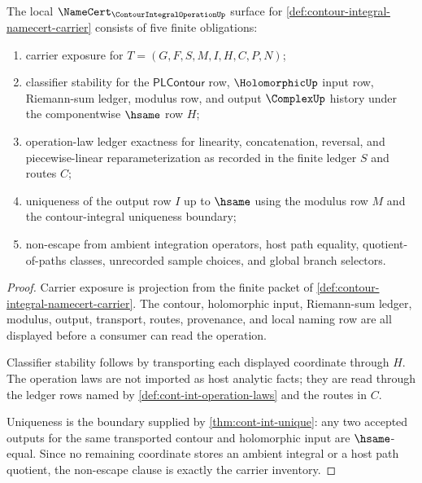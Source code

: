 \begin{theorem}
\label{thm:contour-integral-namecert-obligations}
The local $\NameCert_{\ContourIntegralOperationUp}$ surface for \autoref{def:contour-integral-namecert-carrier} consists of five finite obligations:
\begin{enumerate}
\item carrier exposure for $T=(G,F,S,M,I,H,C,P,N)$;
\item classifier stability for the $\mathsf{PLContour}$ row, $\HolomorphicUp$ input row, Riemann-sum ledger, modulus row, and output $\ComplexUp$ history under the componentwise $\hsame$ row $H$;
\item operation-law ledger exactness for linearity, concatenation, reversal, and piecewise-linear reparameterization as recorded in the finite ledger $S$ and routes $C$;
\item uniqueness of the output row $I$ up to $\hsame$ using the modulus row $M$ and the contour-integral uniqueness boundary;
\item non-escape from ambient integration operators, host path equality, quotient-of-paths classes, unrecorded sample choices, and global branch selectors.
\end{enumerate}
\end{theorem}
\begin{proof}
Carrier exposure is projection from the finite packet of \autoref{def:contour-integral-namecert-carrier}. The contour, holomorphic input, Riemann-sum ledger, modulus, output, transport, routes, provenance, and local naming row are all displayed before a consumer can read the operation.

Classifier stability follows by transporting each displayed coordinate through $H$. The operation laws are not imported as host analytic facts; they are read through the ledger rows named by \autoref{def:cont-int-operation-laws} and the routes in $C$.

Uniqueness is the boundary supplied by \autoref{thm:cont-int-unique}: any two accepted outputs for the same transported contour and holomorphic input are $\hsame$-equal. Since no remaining coordinate stores an ambient integral or a host path quotient, the non-escape clause is exactly the carrier inventory.
\end{proof}

